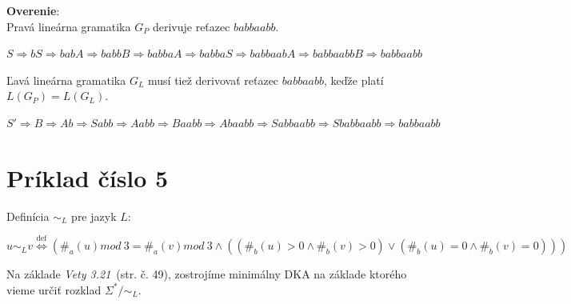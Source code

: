 \documentclass[11pt,a4paper]{article}
\begin{document}
\textbf{Overenie}:\\
Pravá lineárna gramatika $G_P$ derivuje reťazec $babbaabb$.
\begin{center}
$S \Rightarrow bS \Rightarrow babA  \Rightarrow babbB \Rightarrow babbaA \Rightarrow babbaS \Rightarrow babbaabA \Rightarrow babbaabbB \Rightarrow babbaabb$
\end{center}

Ľavá lineárna gramatika $G_L$ musí tiež derivovať reťazec $babbaabb$, keďže platí $L(G_P)=L(G_L)$.
\begin{center}
$S' \Rightarrow B \Rightarrow Ab \Rightarrow Sabb \Rightarrow Aabb \Rightarrow Baabb \Rightarrow Abaabb \Rightarrow Sabbaabb \Rightarrow Sbabbaabb \Rightarrow babbaabb$
\end{center}




\section{Príklad číslo 5}

Definícia $\sim_L$ pre jazyk $L$:\\[-1.5em]
\begin{center}
$u \sim_L v \stackrel{\text{def}}{\Longleftrightarrow} (\#_a(u)mod\ 3 = \#_a(v)mod\ 3 \wedge ((\#_b(u) > 0 \wedge \#_b(v) > 0) \vee (\#_b(u) = 0 \wedge \#_b(v) = 0)))$
\end{center}

Na základe \textit{Vety 3.21}~\cite{TIN}(str. č. 49), zostrojíme minimálny DKA na základe ktorého vieme určiť rozklad $\Sigma^* / \sim_L$.
\end{document}

